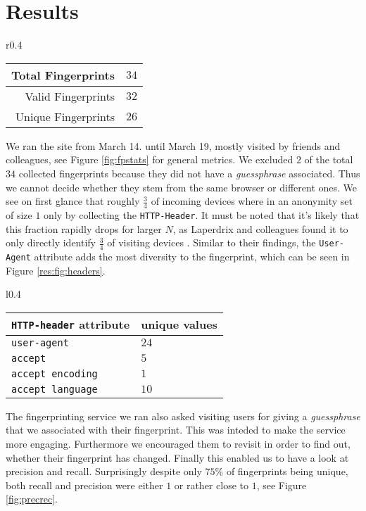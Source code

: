 \section{Results} %
\label{sec:results}


\begin{wrapfigure}{r}{0.4\linewidth}
\centering
\begin{tabular}{|r|c|}
\hline
Total Fingerprints & $34$ \\ \hline
Valid Fingerprints & $32$ \\ \hline
Unique Fingerprints & $26$\\ \hline
\end{tabular}
\caption{Descriptives}
\label{fig:fpstats}
\vspace{-0.25in}
\end{wrapfigure}


We ran the site from March 14. until March 19, mostly visited by friends and colleagues, see Figure \ref{fig:fpstats} for general metrics. We excluded $2$ of the total $34$ collected fingerprints because they did not have a \emph{guessphrase} associated. Thus we cannot decide whether they stem from the same browser or different ones. We see on first glance that roughly $\frac{3}{4}$ of incoming devices where in an anonymity set of size $1$ only by collecting the \texttt{HTTP-Header}. It must be noted that it's likely that this fraction rapidly drops for larger $N$, as Laperdrix and colleagues found it to only directly identify $\frac{3}{4}$ of visiting devices \cite{laperdrix_beauty_2016}. Similar to their findings, the \texttt{User-Agent} attribute adds the most diversity to the fingerprint, which can be seen in Figure \ref{res:fig:headers}.

\begin{wrapfigure}{l}{0.4\textwidth}
\centering
\footnotesize
\begin{tabular}{|p{2cm}|p{1cm}|}
\hline
\texttt{HTTP-header} attribute & unique values \\ \hline\hline
\texttt{user-agent} & $24$ \\\hline
\texttt{accept} & $5$ \\ \hline 
\texttt{accept encoding} & $1$ \\\hline
\texttt{accept language} & $10$ \\\hline
\end{tabular}
\caption{Fingerprints}
\label{res:fig:headers}
\end{wrapfigure}
The fingerprinting service we ran also asked visiting users for giving a \emph{guessphrase} that we associated with their fingerprint. This was inteded to make the service more engaging. Furthermore we encouraged them to revisit in order to find out, whether their fingerprint has changed. Finally this enabled us to have a look at precision and recall. Surprisingly despite only $75\%$ of fingerprints being unique, both recall and precision were either $1$ or rather close to $1$, see Figure \ref{fig:precrec}. 

